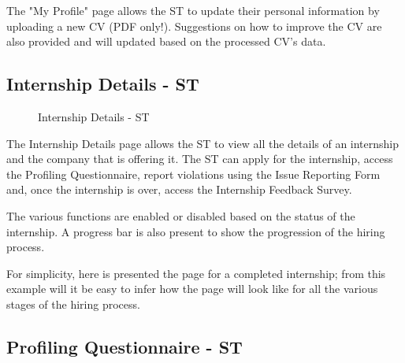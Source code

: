 \par The "My Profile" page allows the ST to update their personal information by uploading a new CV (PDF only!).
Suggestions on how to improve the CV are also provided and will updated based on the processed CV's data.

\subsection{Internship Details - ST}

\begin{figure}[H]
    \centering
    \caption{Internship Details - ST}
    \label{fig:internship-details-st}
\end{figure}

\par The Internship Details page allows the ST to view all the details of an internship and the company that is
offering it. The ST can apply for the internship, access the Profiling Questionnaire, report violations using the
Issue Reporting Form and, once the internship is over, access the Internship Feedback Survey.

\par The various functions are enabled or disabled based on the status of the internship. A progress bar is also
present to show the progression of the hiring process.

\par For simplicity, here is presented the page for a completed internship; from this example will it be easy to infer
how the page will look like for all the various stages of the hiring process.

\subsection{Profiling Questionnaire - ST}
\label{subsec:profiling-questionnaire-st}%

